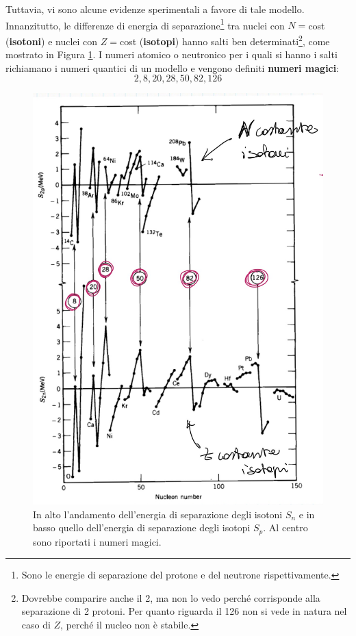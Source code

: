 \newline
Tuttavia, vi sono alcune evidenze sperimentali a favore di tale modello. Innanzitutto, le differenze di energia di separazione\footnote{Sono le energie di separazione del protone e del neutrone rispettivamente.} tra nuclei con $N=$cost (\textbf{isotoni}) e nuclei con $Z=$cost (\textbf{isotopi}) hanno salti ben determinati\footnote{Dovrebbe comparire anche il 2, ma non lo vedo perché corrisponde alla separazione di 2 protoni. Per quanto riguarda il 126 non si vede in natura nel caso di $Z$, perché il nucleo non è stabile.}, come mostrato in Figura \ref{diffeng}. I numeri atomico o neutronico per i quali si hanno i salti richiamano i numeri quantici di un modello  e vengono definiti \textbf{numeri magici}:
$$2,8,20,28,50,82,126$$
\begin{figure}[!h]
    \centering
    \includegraphics[scale=0.2]{Immagini/mag-num.png}
    \caption{In alto l'andamento dell'energia di separazione degli isotoni $S_n$ e in basso quello dell'energia di separazione degli isotopi $S_p$. Al centro sono riportati i numeri magici.}
    \label{diffeng}
\end{figure}

